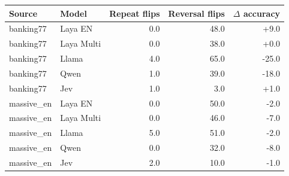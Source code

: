 \begin{tabular}{llrrr}
\toprule
Source & Model & Repeat flips & Reversal flips & $\Delta$ accuracy \\
\midrule
banking77 & Laya EN & 0.0 & 48.0 & +9.0 \\
banking77 & Laya Multi & 0.0 & 38.0 & +0.0 \\
banking77 & Llama & 4.0 & 65.0 & -25.0 \\
banking77 & Qwen & 1.0 & 39.0 & -18.0 \\
banking77 & Jev & 1.0 & 3.0 & +1.0 \\
massive\_en & Laya EN & 0.0 & 50.0 & -2.0 \\
massive\_en & Laya Multi & 0.0 & 46.0 & -7.0 \\
massive\_en & Llama & 5.0 & 51.0 & -2.0 \\
massive\_en & Qwen & 0.0 & 32.0 & -8.0 \\
massive\_en & Jev & 2.0 & 10.0 & -1.0 \\
\bottomrule
\end{tabular}
